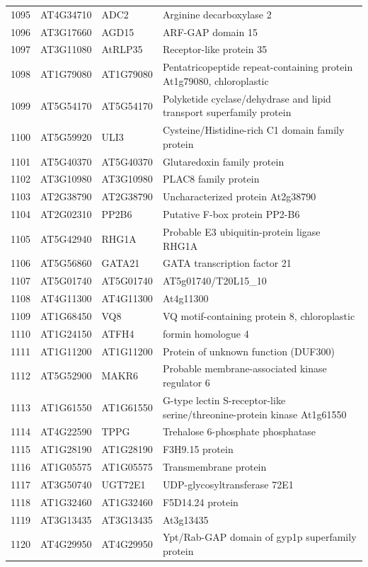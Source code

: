 \documentclass[11pt]{article}
\begin{document}
\begin{center}
\begin{tabular}{rlll}
1095 & AT4G34710 & ADC2 & Arginine decarboxylase 2\\
1096 & AT3G17660 & AGD15 & ARF-GAP domain 15\\
1097 & AT3G11080 & AtRLP35 & Receptor-like protein 35\\
1098 & AT1G79080 & AT1G79080 & Pentatricopeptide repeat-containing protein At1g79080, chloroplastic\\
1099 & AT5G54170 & AT5G54170 & Polyketide cyclase/dehydrase and lipid transport superfamily protein\\
1100 & AT5G59920 & ULI3 & Cysteine/Histidine-rich C1 domain family protein\\
1101 & AT5G40370 & AT5G40370 & Glutaredoxin family protein\\
1102 & AT3G10980 & AT3G10980 & PLAC8 family protein\\
1103 & AT2G38790 & AT2G38790 & Uncharacterized protein At2g38790\\
1104 & AT2G02310 & PP2B6 & Putative F-box protein PP2-B6\\
1105 & AT5G42940 & RHG1A & Probable E3 ubiquitin-protein ligase RHG1A\\
1106 & AT5G56860 & GATA21 & GATA transcription factor 21\\
1107 & AT5G01740 & AT5G01740 & AT5g01740/T20L15\_10\\
1108 & AT4G11300 & AT4G11300 & At4g11300\\
1109 & AT1G68450 & VQ8 & VQ motif-containing protein 8, chloroplastic\\
1110 & AT1G24150 & ATFH4 & formin homologue 4\\
1111 & AT1G11200 & AT1G11200 & Protein of unknown function (DUF300)\\
1112 & AT5G52900 & MAKR6 & Probable membrane-associated kinase regulator 6\\
1113 & AT1G61550 & AT1G61550 & G-type lectin S-receptor-like serine/threonine-protein kinase At1g61550\\
1114 & AT4G22590 & TPPG & Trehalose 6-phosphate phosphatase\\
1115 & AT1G28190 & AT1G28190 & F3H9.15 protein\\
1116 & AT1G05575 & AT1G05575 & Transmembrane protein\\
1117 & AT3G50740 & UGT72E1 & UDP-glycosyltransferase 72E1\\
1118 & AT1G32460 & AT1G32460 & F5D14.24 protein\\
1119 & AT3G13435 & AT3G13435 & At3g13435\\
1120 & AT4G29950 & AT4G29950 & Ypt/Rab-GAP domain of gyp1p superfamily protein\\

\end{tabular}
\end{center}
\end{document}
